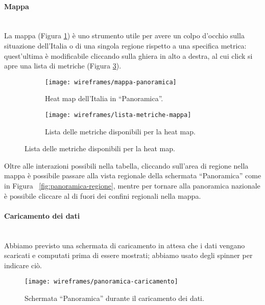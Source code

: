 \documentclass[../../../main.tex]{subfiles}
\begin{document}
\paragraph{Mappa}\mbox{}\\
La mappa (Figura \ref{fig:mappa-panoramica}) è uno strumento utile per avere un colpo d'occhio sulla situazione dell'Italia o di una singola regione rispetto a una specifica metrica: quest'ultima è modificabile cliccando sulla ghiera in alto a destra, al cui click si apre una lista di metriche (Figura \ref{fig:lista-metriche-mappa}).
\begin{figure}[H]
    \begin{subfigure}[b]{0.5\textwidth}
        \centering
    \texttt{[image: wireframes/mappa-panoramica]}
    \caption{Heat map dell'Italia in ``Panoramica''.}
    \label{fig:mappa-panoramica}
    \end{subfigure}
    \hfill
    \begin{subfigure}[b]{0.5\textwidth}
        \centering
        \texttt{[image: wireframes/lista-metriche-mappa]}
        \caption{Lista delle metriche disponibili per la heat map.}
        \label{fig:lista-metriche-mappa}
    \end{subfigure}
\end{figure}

Oltre alle interazioni possibili nella tabella, cliccando sull'area di regione nella mappa è possibile passare alla vista regionale della schermata ``Panoramica'' come in Figura ~\ref{fig:panoramica-regione}, mentre per tornare alla panoramica nazionale è possibile cliccare al di fuori dei confini regionali nella mappa.

\paragraph{Caricamento dei dati}\mbox{}\\
Abbiamo previsto una schermata di caricamento in attesa che i dati vengano scaricati e computati prima di essere mostrati; abbiamo usato degli spinner per indicare ciò.
\begin{figure}[H]
    \centering
    \texttt{[image: wireframes/panoramica-caricamento]}
    \caption{Schermata ``Panoramica'' durante il caricamento dei dati.}
    \label{fig:panoramica-caricamento}
\end{figure}
\end{document}
